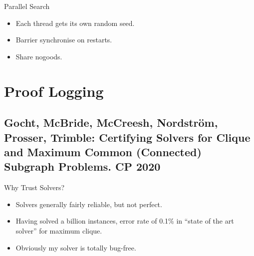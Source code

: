 \documentclass[aspectratio=169,compress,10pt]{beamer}
\begin{document}
\begin{frame}{Parallel Search}
    \begin{itemize}
        \item Each thread gets its own random seed.
        \item Barrier synchronise on restarts.
        \item Share nogoods.
    \end{itemize}
\end{frame}

\section{Proof Logging}

\subsection{Gocht, McBride, McCreesh, Nordstr\"om, Prosser, Trimble: Certifying Solvers for Clique and Maximum Common (Connected) Subgraph Problems.
CP 2020}

\begin{frame}{Why Trust Solvers?}
    \begin{itemize}
        \item Solvers generally fairly reliable, but not perfect.
        \item Having solved a billion instances, error rate of 0.1\% in ``state of the
            art solver'' for maximum clique.
            \pause
        \item Obviously my solver is totally bug-free.
    \end{itemize}
\end{frame}
\end{document}
